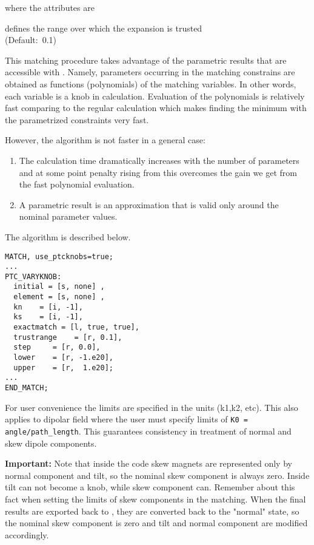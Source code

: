 where the attributes are
\begin{madlist}
   defines the range over which the expansion is
  trusted \\ (Default:~0.1)
\end{madlist}

This matching procedure takes advantage of the parametric results that
are accessible with \ptc. Namely, parameters occurring in the matching
constrains are obtained as functions (polynomials) of the matching
variables. In other words, each variable is a knob in \ptc
calculation. Evaluation of the polynomials is relatively fast comparing
to the regular \ptc calculation which makes finding the minimum with the
parametrized constraints very fast.  

However, the algorithm is not faster in a general case: 
\begin{enumerate}
   \item  The calculation time dramatically increases with the number of
     parameters and at some point penalty rising from this overcomes the
     gain we get from the fast polynomial evaluation.    
   \item  A parametric result is an approximation that is valid only
     around the nominal parameter values.     
\end{enumerate}

The algorithm is described below. \\
 
\begin{verbatim}
MATCH, use_ptcknobs=true;
...
PTC_VARYKNOB: 
  initial = [s, none] , 
  element = [s, none] , 
  kn    = [i, -1], 
  ks    = [i, -1], 
  exactmatch = [l, true, true], 
  trustrange    = [r, 0.1],  
  step     = [r, 0.0], 
  lower    = [r, -1.e20],
  upper    = [r,  1.e20]; 
...
END_MATCH;
\end{verbatim}

For user convenience the limits are specified in the \madx units (k1,k2,
etc). This also applies to dipolar field where the user must specify
limits of \texttt{K0 = angle/path\_length}. This guarantees consistency in
treatment of normal and skew dipole components.   

\textbf{Important:} Note that inside the code skew magnets are represented
only by normal component and tilt, so the nominal skew component is
always zero.  Inside \ptc tilt can not become a knob, while skew
component can.  Remember about this fact when setting the limits of skew
components in the matching.  When the final results are exported back to
\madx, they are converted back to the "normal" state, so the nominal
skew component is zero and tilt and normal component are modified
accordingly.


